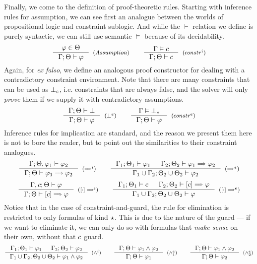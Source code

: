 \documentclass[english, mgr]{iithesis}
\renewcommand{\it}[1]{\textit{#1}}
\begin{document}
Finally, we come to the definition of proof-theoretic rules.
Starting with inference rules for assumption,
we can see first an analogue between the worlds of propositional logic
and constraint sublogic.
And while the $\vdash$ relation we define is purely syntactic,
we can still use semantic $\vDash$ because of its decidability.
$$
  \inference{
    \formphi \in \Theta
  }{
    \jgmnt[\cEnv;\Theta]{\formphi}
  }[(\ensuremath{Assumption})]
  \qquad
  \inference{
    \cjgmnt[\cEnv]{\constr}
  }{
    \jgmnt[\cEnv;\Theta]{\constr}
  }[(\ensuremath{constr^i})]
$$
Again, for \it{ex falso}, we define an analogous proof constructor for dealing with a contradictory
constraint environment.
Note that there are many constraints that can be used as $\bot_c$, i.e.
constraints that are always false, and the solver will only \it{prove} them
if we supply it with contradictory assumptions.
$$
  \inference{
    \jgmnt[\cEnv;\Theta]{\bot}
  }{
    \jgmnt[\cEnv;\Theta]{\formphi}
  }[(\ensuremath{\bot^e})]
  \qquad
  \inference{
    \cjgmnt[\cEnv]{\bot_\constr}
    }{
    \jgmnt[\cEnv;\Theta]{\formphi}
  }[(\ensuremath{constr^e})]
$$
Inference rules for implication are standard, and the reason we present them here
is not to bore the reader, but to point out the similarities to their constraint analogues.
$$
  \inference{
    \jgmnt[\cEnv;\Theta,\formphi_1]{\formphi_2}
  }{
    \jgmnt[\cEnv;\Theta]{\formphi_1 \fImp \formphi_2}
  }[(\ensuremath{\fImp^i})]
  \qquad
  \inference{
    \jgmnt[\cEnv_1;\Theta_1]{\formphi_1} &
    \jgmnt[\cEnv_2;\Theta_2]{\formphi_1 \fImp \formphi_2}
    }{
    \jgmnt[\cEnv_1 \cup \cEnv_2;\Theta_2 \cup \Theta_2]{\formphi_2}
  }[(\ensuremath{\fImp^e})]
$$
$$
  \inference{
    \jgmnt[\cEnv, \constr;\Theta]{\formphi}
  }{
    \jgmnt[\cEnv;\Theta]{\fCImp{\constr}\formphi}
  }[(\ensuremath{\fCImp{\cdot}^i})]
  \qquad
  \inference{
    \jgmnt[\cEnv_1;\Theta_1]{\constr} &
    \jgmnt[\cEnv_2;\Theta_2]{\fCImp{\constr}\formphi}
    }{
    \jgmnt[\cEnv_1 \cup \cEnv_2;\Theta_2 \cup \Theta_2]{\formphi}
  }[(\ensuremath{\fCImp{\cdot}^e})]
$$
Notice that in the case of constraint-and-guard, the rule for elimination is restricted
to only formulas of kind $\star$.
This is due to the nature of the guard --- if we want to eliminate it,
we can only do so with formulas that \it{make sense} on their own,
without that $c$ guard.
$$
  \inference{
    \jgmnt[\cEnv_1;\Theta_1]{\formphi_1} &
    \jgmnt[\cEnv_2;\Theta_2]{\formphi_2}
  }{
    \jgmnt[\cEnv_1 \cup \cEnv_2;\Theta_2 \cup \Theta_2]{\formphi_1 \wedge \formphi_2}
  }[(\ensuremath{\wedge^i})]
  \qquad
  \inference{
    \jgmnt[\cEnv;\Theta]{\formphi_1 \wedge \formphi_2}
    }{
    \jgmnt[\cEnv;\Theta]{\formphi_1}
  }[(\ensuremath{\wedge^e_1})]\qquad
  \inference{
    \jgmnt[\cEnv;\Theta]{\formphi_1 \wedge \formphi_2}
    }{
    \jgmnt[\cEnv;\Theta]{\formphi_2}
  }[(\ensuremath{\wedge^e_2})]
$$
\end{document}
